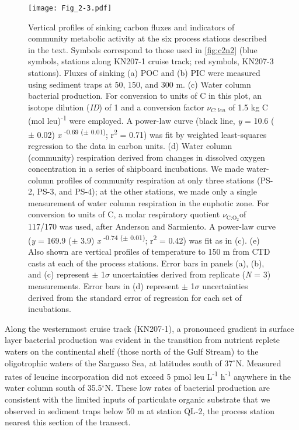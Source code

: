 \begin{figure}[!p]
\centering
\texttt{[image: Fig\_2-3.pdf]}
\caption[Vertical profiles of sinking carbon fluxes and indicators of community metabolic activity at the six process stations described in the text.]{Vertical profiles of sinking carbon fluxes and indicators of community metabolic activity at the six process stations described in the text. Symbols correspond to those used in \autoref{fig:c2n2} (blue symbols, stations along KN207-1 cruise track; red symbols, KN207-3 stations). Fluxes of sinking (a) POC and (b) PIC were measured using sediment traps at 50, 150, and 300 m. (c) Water column bacterial production. For conversion to units of C in this plot, an isotope dilution (\emph{ID}) of 1 and a conversion factor $\nu _{C:leu}$ of 1.5 kg C (mol leu)\textsuperscript{-1} were employed. A power-law curve (black line, \emph{y} = 10.6 ($\pm$ 0.02) \emph{x} \textsuperscript{-0.69 ($\pm$ 0.01)}; r\textsuperscript{2} = 0.71) was fit by weighted least-squares regression to the data in carbon units. (d) Water column (community) respiration derived from changes in dissolved oxygen concentration in a series of shipboard incubations. We made water-column profiles of community respiration at only three stations (PS-2, PS-3, and PS-4); at the other stations, we made only a single measurement of water column respiration in the euphotic zone. For conversion to units of C, a molar respiratory quotient $\nu _{{\text{C:}}{{\text{O}}_{\text{2}}}}$of 117/170 was used, after Anderson and Sarmiento. A power-law curve (\emph{y} = 169.9 ($\pm$ 3.9) \emph{x} \textsuperscript{-0.74 ($\pm$ 0.01)}; r\textsuperscript{2} = 0.42) was fit as in (c). (e) Also shown are vertical profiles of temperature to 150 m from CTD casts at each of the process stations. Error bars in panels (a), (b), and (c) represent $\pm$ 1$\sigma$ uncertainties derived from replicate (\emph{N} = 3) measurements. Error bars in (d) represent $\pm$ 1$\sigma$ uncertainties derived from the standard error of regression for each set of incubations.}
\label{fig:c2n3}
\end{figure}

Along the westernmost cruise track (KN207-1), a pronounced gradient in surface layer bacterial production was evident in the transition from nutrient replete waters on the continental shelf (those north of the Gulf Stream) to the oligotrophic waters of the Sargasso Sea, at latitudes south of 37$^{\circ}$N. Measured rates of leucine incorporation did not exceed 5 pmol leu L\textsuperscript{-1} h\textsuperscript{-1} anywhere in the water column south of 35.5$^{\circ}$N. These low rates of bacterial production are consistent with the limited inputs of particulate organic substrate that we observed in sediment traps below 50 m at station QL-2, the process station nearest this section of the transect.

